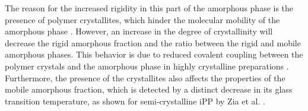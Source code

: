 The reason for the increased rigidity in this part of the amorphous phase is the presence of polymer crystallites, which hinder the molecular mobility of the amorphous phase \citep{ziaRigidAmorphousFraction2008, peacockHandbookPolyethyleneStructures2014}.
However, an increase in the degree of crystallinity will decrease the rigid amorphous fraction and the ratio between the rigid and mobile amorphous phases.
This behavior is due to reduced covalent coupling between the polymer crystals and the amorphous phase in highly crystalline preparations \citep{ziaRigidAmorphousFraction2008}.
Furthermore, the presence of the crystallites also affects the properties of the mobile amorphous fraction, which is detected by a distinct decrease in its glass transition temperature, as shown for semi-crystalline iPP by Zia et al. \citep{ziaRigidAmorphousFraction2008}.

